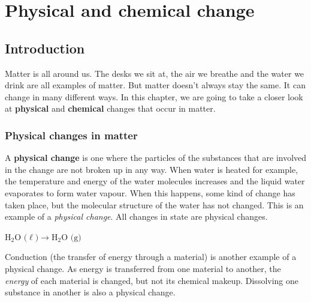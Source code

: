          \chapter{Physical and chemical change}
    \setcounter{figure}{1}
    \setcounter{subfigure}{1}
    \label{m38709*cid1}
            \section{Introduction}
            \nopagebreak
      \label{m38709*id62175}Matter is all around us. The desks we sit at, the air we breathe and the water we drink are all examples of matter. But matter doesn't always stay the same. It can change in many different ways. In this chapter, we are going to take a closer look at \textbf{physical} and \textbf{chemical} changes that occur in matter.\par 
{}
    \label{m38709*cid2}
            \subsection*{Physical changes in matter}
            \nopagebreak
      \label{m38709*id62200}A \textbf{physical change} is one where the particles of the substances that are involved in the change are not broken up in any way. When water is heated for example, the temperature and energy of the water molecules increases and the liquid water evaporates to form water vapour. When this happens, some kind of change has taken place, but the molecular structure of the water has not changed. This is an example of a \textsl{physical change}. All changes in state are physical changes.\par 
      \label{m38709*id62556}$\text{H}_{2}\text{O (}\ell \text{)} \to \text{H}_{2}\text{O (g)}$
      \par 
      \label{m38709*id62600}Conduction (the transfer of energy through a material) is another example of a physical change. As energy is transferred from one material to another, the \textsl{energy} of each material is changed, but not its chemical makeup. Dissolving one substance in another is also a physical change.\par 


